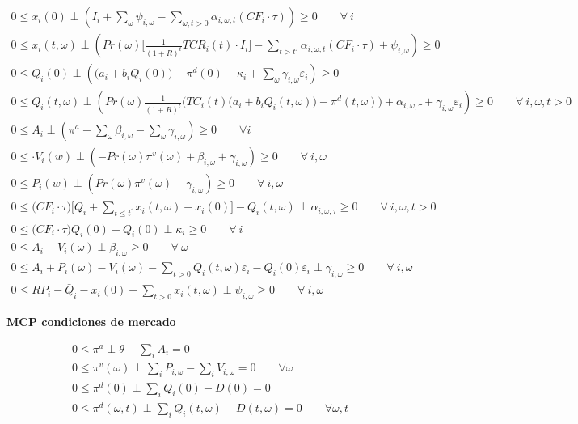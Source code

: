 \begin{footnotesize}
\begin{align}
    0 \leq x_i(0) \perp (I_i  + \sum_{\omega}\psi_{i,\omega} -\sum_{\omega, t>0} \alpha_{i,\omega,t}(CF_i\cdot \tau)) \geq 0 \qquad \forall \  i \\
    0 \leq x_i(t,\omega) \perp (Pr(\omega) \Bigg[\frac{1}{(1+R)^t}TCR_i(t) \cdot I_i \Bigg] - \sum_{t> t\prime}\alpha_{i,\omega,t} ( CF_i \cdot \tau)+ \psi_{i,\omega}) \geq 0\\
    0 \leq Q_i(0) \perp ( \big(a_{i}+b_i Q_{i}(0)\big)-\pi^d(0) + \kappa_i  + \sum_{\omega} \gamma_{i,\omega}\varepsilon_i) \geq 0\\
    0 \leq Q_i(t,\omega) \perp (Pr(\omega)  \frac{1}{(1+R)^t} \bigg( TC_i(t) \big(a_{i}+b_i Q_i(t,\omega)\big ) -\pi^d(t,\omega) \bigg) + \alpha_{i,\omega,\tau} + \gamma_{i,\omega} \varepsilon_{i}) \geq 0 \qquad \forall \ i, \omega, t > 0\\
    0 \leq A_i \perp (\pi^{a} - \sum_{\omega}\beta_{i,\omega} - \sum_{\omega}\gamma_{i,\omega}) \geq 0 \qquad \forall  i\\
    0 \leq \cdot  V_i(w) \perp (-Pr(\omega) \pi^v(\omega) + \beta_{i,\omega}  + \gamma_{i,\omega})\geq 0 \qquad \forall \  i, \omega\\ 
   0 \leq  P_i(w) \perp (Pr(\omega) \pi^v(\omega) -\gamma_{i,\omega}) \geq  0  \qquad \forall \  i, \omega \\
     0 \leq \big(CF_i \cdot \tau \big) \Bigg[\bar{Q}_i + \sum_{t\leq t^{\prime}} x_i(t,\omega) + x_i(0) \Bigg] - Q_i(t,\omega)  \perp \alpha_{i,\omega,\tau} \geq 0 \qquad \forall \ i, \omega, t  > 0\\
     0 \leq \Big(CF_i\cdot\tau \Big)\bar{Q}_i(0)-Q_{i}(0) \perp \kappa_i \geq 0 \qquad \forall \ i \\
     0 \leq  A_{i} - V_i(\omega) \perp \beta_{i,\omega} \geq 0 \qquad \forall  \ \omega \\
     0 \leq  A_{i} + P_{i} (\omega) - V_i(\omega) - \sum_{t>0} Q_i(t,\omega) \varepsilon_{i} -Q_i(0)\varepsilon_{i} \perp \gamma_{i,\omega} \geq 0 \qquad \forall \ i, \omega\\
     0 \leq  RP_i - \bar{Q}_i - x_i(0) - \sum_{t>0} x_i(t,\omega) \perp \psi_{i,\omega} \geq 0 \qquad \forall \ i,\omega 
\end{align}
\end{footnotesize}

\textbf{MCP condiciones de mercado}

\begin{footnotesize}
\begin{align}
0 \leq \pi^a \perp \theta - \sum_{i}A_i= 0\\
0 \leq \pi^v(\omega) \perp \sum_{i}P_{i,\omega} - \sum_{i}V_{i,\omega} = 0 \qquad \forall \omega\\
0 \leq \pi^d(0) \perp \sum_{i}Q_i(0) - D(0)= 0\\
 0 \leq \pi^d(\omega,t) \perp \sum_{i}Q_i(t,\omega) - D(t,\omega) = 0 \qquad \forall \omega,t
\end{align}
\end{footnotesize}

